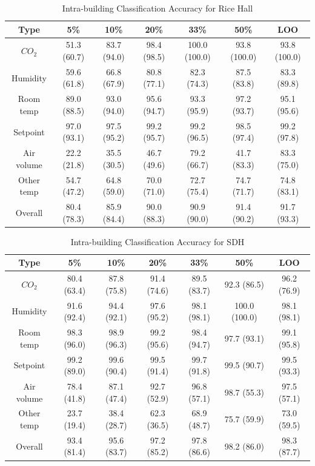 \begin{table}[ht!]
\centering %
\begin{tabular}{c | c | c | c | c | c | c}%
\hline %
Type & 5\% & 10\% & 20\% & 33\% & 50\% & LOO\\ %
\hline\hline %
$CO_{2}$ & 51.3 (60.7) & 83.7 (94.0) & 98.4 (98.5) & 100.0 (100.0) & 93.8 (100.0) & 93.8 (100.0)\\ \hline
Humidity & 59.6 (61.8) & 66.8 (67.9) & 80.8 (77.1) & 82.3 (74.3) & 87.5 (83.8) & 83.3 (89.8)\\ \hline
Room temp & 89.0 (88.5) & 93.0 (94.0) & 95.6 (94.7) & 93.3 (95.9) & 97.2 (93.7) & 95.1 (95.6)\\ \hline
Setpoint & 97.0 (93.1) & 97.5 (95.2) & 99.2 (95.7) & 99.2 (96.5) & 98.5 (97.4) & 99.2 (97.8)\\ \hline
Air volume & 22.2 (21.8) & 35.5 (30.5) & 46.7 (49.6) & 79.2 (66.7) & 41.7 (83.3) & 83.3 (75.0)\\ \hline
Other temp & 54.7 (47.2) & 64.8 (59.0) & 70.0 (71.0) & 72.7 (75.4) & 74.7 (71.7) & 74.8 (83.1)\\ \hline
Overall & 80.4 (78.3) & 85.9 (84.4) & 90.0 (88.3) & 90.9 (90.0) & 91.4 (90.2) & 91.7 (93.3)\\ \hline
\end{tabular}
\caption{Intra-building Classification Accuracy for Rice Hall}
\label{table:rice} %
\end{table}

\begin{table}[ht!]
\centering %
\begin{tabular}{c | c | c | c | c | c | c}%
\hline %
Type & 5\% & 10\% & 20\% & 33\% & 50\% & LOO\\ %
\hline\hline %
$CO_{2}$ & 80.4 (63.4) & 87.8 (75.8) & 91.4 (74.6) & 89.5 (83.7) & 92.3 (86.5) & 96.2 (76.9)\\ \hline
Humidity & 91.6 (92.4) & 94.4 (92.1) & 97.6 (95.2) & 98.1 (98.1) & 100.0 (100.0) & 98.1 (98.1)\\ \hline
Room temp & 98.3 (96.0) & 98.9 (96.3) & 99.2 (95.6) & 98.4 (94.7) & 97.7 (93.1) & 99.1 (95.8)\\ \hline
Setpoint & 99.2 (89.0) & 99.6 (90.4) & 99.5 (91.4) & 99.7 (91.8) & 99.5 (90.7) & 99.5 (93.3)\\ \hline
Air volume & 78.4 (41.8) & 87.1 (47.4) & 92.7 (52.9) & 96.8 (57.1) & 98.7 (55.3) & 97.5 (57.1)\\ \hline
Other temp & 23.7 (19.4) & 38.4 (28.7) & 62.3 (36.5) & 68.9 (48.7) & 75.7 (59.9) & 73.0 (59.5)\\ \hline
Overall & 93.4 (81.4) & 95.6 (83.7) & 97.2 (85.2) & 97.8 (86.6) & 98.2 (86.0) & 98.3 (87.7)\\ \hline
\end{tabular}
\caption{Intra-building Classification Accuracy for SDH}
\label{table:sdh} %
\end{table}

